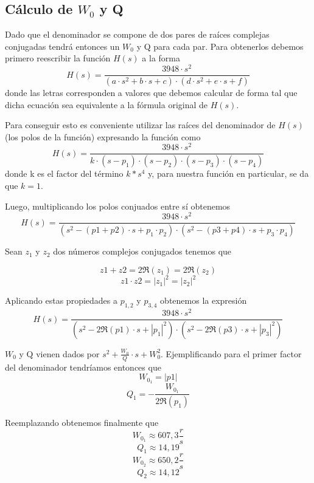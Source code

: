 \documentclass[11pt,a4paper]{report}
\begin{document}
\subsection*{Cálculo de $W_{0}$ y Q}

Dado que el denominador se compone de dos pares de raíces complejas conjugadas tendrá entonces un $W_{0}$ y Q para cada par. Para obtenerlos debemos primero reescribir la función $H(s)$ a la forma
\[H(s)=\frac{3948 \cdot s^2}{(a \cdot s^2+b \cdot s+c) \cdot (d \cdot s^2+e \cdot s+f)}\]
donde las letras corresponden a valores que debemos calcular de forma tal que dicha
ecuación sea equivalente a la fórmula original de $H(s)$.

\bigskip
Para conseguir esto es conveniente utilizar las raíces del denominador de $H(s)$ (los polos de la función) expresando la función como
\[H(s)=\frac{3948 \cdot s^2}{k \cdot (s-p_{1}) \cdot (s-p_{2}) \cdot (s-p_{3}) \cdot (s-p_{4})}\]
donde k es el factor del término $k*s^4$ y, para nuestra función en particular,
se da que $k=1$. 

\bigskip
Luego, multiplicando los polos conjuados entre sí obtenemos
\[H(s)=\frac{3948 \cdot s^2}{(s^2-(p1+p2) \cdot s+p_{1} \cdot p_{2}) \cdot (s^2-(p3+p4) \cdot s+p_{3} \cdot p_{4})}\]

\bigskip
Sean $z_{1}$ y $z_{2}$ dos números complejos conjugados tenemos que 

\[z1+z2=2\Re(z_{1}) = 2\Re(z_{2})\] 
\[z1 \cdot z2=|z_{1}|^2=|z_{2}|^2\] 

Aplicando estas propiedades a $p_{1,2}$ y 
$p_{3,4}$ obtenemos la expresión
\[H(s)=\frac{3948 \cdot s^2}{(s^2-2\Re(p1) \cdot s+|p_{1}|^2) \cdot (s^2-2\Re(p3) \cdot s+|p_{3}|^2)}\]

\bigskip
$W_{0}$ y Q vienen dados por $s^2+\frac{W_{0}}{Q} \cdot s + W_{0}^2$. Ejemplificando para el primer factor del denominador tendríamos entonces que 
\[W_{0_{1}} = |p1|\]
\[Q_{1} = -\frac{W_{0_{1}}}{2\Re(p_{1})}\]

\bigskip
Reemplazando obtenemos finalmente que
\[W_{0_{1}} \approx 607,3 \frac{r}{s}\]
\[Q_{1} \approx 14,19\]
\[W_{0_{2}} \approx 650,2 \frac{r}{s}\]
\[Q_{2} \approx 14,12\]
\end{document}
